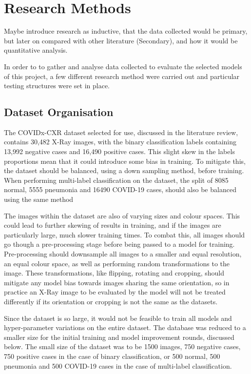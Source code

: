 \section{Research Methods}
Maybe introduce research as inductive, that the data collected would be primary, but later on compared with other literature (Secondary), and how it would be quantitative analysis.

In order to to gather and analyse data collected to evaluate the selected models of this project, a few different research method were carried out and particular testing structures were set in place.

\subsection{Dataset Organisation}
The COVIDx-CXR dataset selected for use, discussed in the literature review, contains 30,482 X-Ray images, with the binary classification labels containing 13,992 negative cases and 16,490 positive cases. This slight skew in the labels proportions mean that it could introduce some bias in training. To mitigate this, the dataset should be balanced, using a down sampling method, before training. When performing multi-label classification on the dataset, the split of 8085 normal, 5555 pneumonia and 16490 COVID-19 cases, should also be balanced using the same method

The images within the dataset are also of varying sizes and colour spaces. This could lead to further skewing of results in training, and if the images are particularly large, much slower training times. To combat this, all images should go though a pre-processing stage before being passed to a model for training. Pre-processing should downsample all images to a smaller and equal resolution, an equal colour space, as well as performing random transformations to the image. These transformations, like flipping, rotating and cropping, should mitigate any model bias towards images sharing the same orientation, so in practice an X-Ray image to be evaluated by the model will not be treated differently if its orientation or cropping is not the same as the datasets.

Since the dataset is so large, it would not be feasible to train all models and hyper-parameter variations on the entire dataset. The database was reduced to a smaller size for the initial training and model improvement rounds, discussed below. The small size of the dataset was to be 1500 images, 750 negative cases, 750 positive cases in the case of binary classification, or 500 normal, 500 pneumonia and 500 COVID-19 cases in the case of multi-label classification.

